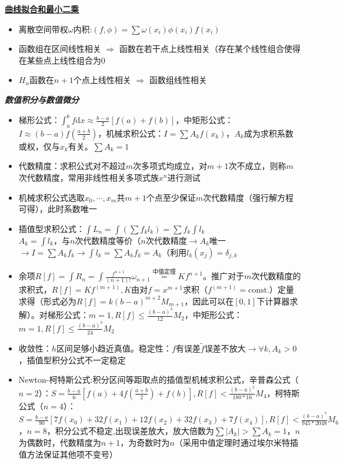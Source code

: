 \documentclass[UTF8,a4paper,landscape,8pt]{paper}
\renewcommand{\subsection}[1]{{\small\textbf{\underline{#1}}}\\ }
\renewcommand{\section}[1]{{\normalsize\textbf{\emph{#1}}}\\ }
\newcommand{\List}[1]{\begin{itemize}[fullwidth,itemindent=0em] #1 \end{itemize}}
\begin{document}
\begin{multicols}{4}
    \subsection{曲线拟合和最小二乘}  
    \List{
        \item {离散空间带权$\omega$内积:$(f,\phi) = \sum \omega(x_i)\phi(x_i)f(x_i)$}
        \item {函数组在区间线性相关 $\Rightarrow$ 函数在若干点上线性相关（存在某个线性组合使得在某些点上线性组合为0}
        \item {$H_n$函数在$n+1$个点上线性相关 $\Rightarrow$ 函数组线性相关}
    }
\section{数值积分与数值微分}
    \List{
        \item {梯形公式：$\int_a^b f\mathrm dx \approx \frac{b-a}{2}[f(a)+f(b)]$，中矩形公式：$I \approx (b-a)f(\frac{a+b}{2})$，机械求积公式：$I = \sum A_kf(x_k)$，$A_k$成为求积系数或权，仅与$x_k$有关。$\sum A_k = 1$}
        \item {代数精度：求积公式对不超过$m$次多项式均成立，对$m+1$次不成立，则称$m$次代数精度，常用非线性相关多项式族$x^n$进行测试}
        \item {机械求积公式选取$x_0,\cdots,x_m$共$m+1$个点至少保证$m$次代数精度（强行解方程可得），此时系数唯一}
        \item {插值型求积公式：$\int L_n = \int (\sum f_kl_k) = \sum f_k \int l_k$\\ $A_k = \int l_k$，与$n$次代数精度等价（$n$次代数精度$\rightarrow A_k$唯一 $\rightarrow I = \sum A_kf_k \rightarrow \int l_k = \sum A_k f_k = A_k$（利用$l_k(x_j) = \delta_{j,k}$}
        \item {余项$R[f] = \int R_n = \int \frac{f^{n+1}}{(n+1)!}\omega_{n+1} \overset{\text{中值定理}}{=} Kf^{n+1}$。推广对于$m$次代数精度的求积式，$R[f] = Kf^{(m+1)},K$由对$f=x^{m+1}$求积（$f^{(m+1)}=\mathrm{const.}$）定量求得（形式必为$R[f] = k(b-a)^{m+2}M_{m+1}$，因此可以在$[0,1]$下计算器求解）。对梯形公式：$m=1,R[f] \le \frac{(b-a)^3}{12}M_2$，中矩形公式：$m=1,R[f] \le \frac{(b-a)^3}{24}M_2$}
        \item {收敛性：$h$区间足够小趋近真值。稳定性：$f$有误差$\widetilde f$误差不放大$\rightarrow \forall k,A_k >0$，插值型积分公式不一定稳定}
        \item{Newton-柯特斯公式:积分区间等距取点的插值型机械求积公式，辛普森公式（$n=2$）：$S = \frac{b-a}{6}[f(a) + 4 f(\frac{a+b}{2}) + f(b)],R[f] < \frac{(b-a)^5}{180*16}M_4$，柯特斯公式（$n=4$）：$S = \frac{b-a}{90}[7f(x_0) + 32f(x_1) + 12f(x_2) + 32 f(x_3) + 7 f(x_4)], R[f] < \frac{(b-a)^7}{945*2048}M_6$，$n=8$，积分公式不稳定,出现误差放大，放大倍数为$\sum |A_k| > \sum A_k = 1$，$n$为偶数时，代数精度为$n+1$，为奇数时为$n$（采用中值定理时通过埃尔米特插值方法保证其他项不变号）}
    }

\end{multicols}
\end{document}
